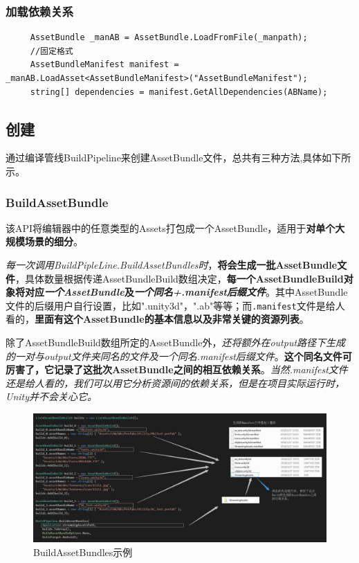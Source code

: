 \documentclass[UTF8,a4paper,12pt]{ctexbook}
\begin{document}
			\subsubsection{加载依赖关系}
				\begin{lstlisting}
	 AssetBundle _manAB = AssetBundle.LoadFromFile(_manpath);
     //固定格式
     AssetBundleManifest manifest = _manAB.LoadAsset<AssetBundleManifest>("AssetBundleManifest");
     string[] dependencies = manifest.GetAllDependencies(ABName);
				\end{lstlisting}
				
		\subsection{创建}
			通过编译管线BuildPipeline来创建AssetBundle文件，总共有三种方法,具体如下所示。
			\subsubsection{BuildAssetBundle}
				该API将编辑器中的任意类型的Assets打包成一个AssetBundle，适用于\textbf{对单个大规模场景的细分}。
				
				\textit{每一次调用BuildPipleLine.BuildAssetBundles时}，\textbf{将会生成一批AssetBundle文件}，具体数量根据传递AssetBundleBuild数组决定，\textbf{每一个AssetBundleBuild对象将对应\textit{一个AssetBundle}及\textit{一个同名+.manifest后缀文件}}。其中AssetBundle文件的后缀用户自行设置，比如".unity3d"，".ab"等等；而\verb|.manifest|文件是给人看的，\textbf{里面有这个AssetBundle的基本信息以及非常关键的资源列表}。
				
				除了AssetBundleBuild数组所定的AssetBundle外，\textit{还将额外在output路径下生成的一对与output文件夹同名的文件及一个同名.manifest后缀文件}。\textbf{这个同名文件可厉害了，它记录了这批次AssetBundle之间的相互依赖关系}。\textit{当然.manifest文件还是给人看的，我们可以用它分析资源间的依赖关系，但是在项目实际运行时，Unity并不会关心它。}
				
					\begin{figure}[H]
						\centering
						\includegraphics[scale=0.54]{AssetBuild}
						\caption{BuildAssetBundles示例}
					\end{figure}
				
\end{document}
